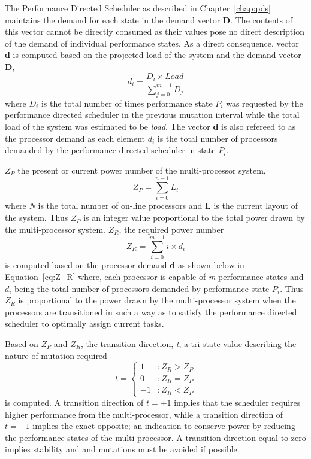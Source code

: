 The Performance Directed Scheduler as described in Chapter~\ref{chap:pds} maintains
the demand for each state in the demand vector \textbf{D}. The contents of this vector
cannot be directly consumed as their values pose no direct description of the demand 
of individual performance states. As a direct consequence, vector \textbf{d} is computed based 
on the projected load of the system and the demand vector \textbf{D},
\begin{equation}
    d_{i} = \frac{D_{i} \times Load}{\displaystyle\sum_{j=0}^{m-1} {D_{j}}}
\label{eq:processor_demand}
\end{equation}
where $D_i$ is the total number of times performance state $P_i$ was requested by the performance directed scheduler in 
the previous mutation interval while the total load of the system was estimated to be \textit{load}. The vector \textbf{d}
is also refereed to as the processor demand as each element $d_i$ is the total number of processors demanded by the 
performance directed scheduler in state $P_i$. 

$Z_P$ the present or current power number of the multi-processor system,
\begin{equation}
    Z_{P} = \displaystyle\sum_{i=0}^{n-1} {L_{i}} 
\label{eq:Z_P}
\end{equation}
where \textit{N} is the total number of on-line processors and \textbf{L} is the current layout of the system. Thus $Z_P$ 
is an integer value proportional to the total power drawn by the multi-processor system. $Z_R$, the required power number  
\begin{equation}
    Z_{R} = \displaystyle\sum_{i=0}^{m-1} {i \times d_{i}} 
\label{eq:Z_R}
\end{equation}
is computed based on the processor demand \textbf{d} as shown below in Equation~\eqref{eq:Z_R} where,
each processor is capable of \textit{m} performance states and $d_i$ being the total number of processors demanded
by performance state $P_i$. Thus $Z_R$ is proportional to the power drawn by the multi-processor system when the processors
are transitioned in such a way as to satisfy the performance directed scheduler to optimally assign current tasks. 

Based on $Z_{P}$ and $Z_{R}$, the transition direction, \textit{t}, a tri-state value describing the nature of 
mutation required
\begin{equation}
    t = \left\{
     \begin{array}{lr}
       1 & : Z_{R} > Z_{P}\\
       0 & : Z_{R} = Z_{P} \\
       -1 & : Z_{R} < Z_{P}
     \end{array}
   \right.
\label{eq:transition_dir}
\end{equation}
is computed. A transition direction of $t = +1$ implies that the scheduler requires higher performance from
the multi-processor, while a transition direction of $t = -1$ implies the exact opposite; an indication
to conserve power by reducing the performance states of the multi-processor. A transition direction equal to zero
implies stability and and mutations must be avoided if possible. 

